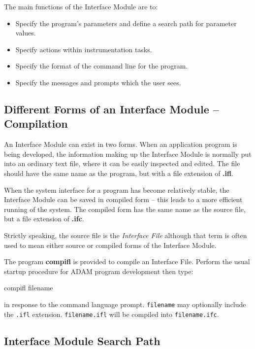 \documentclass[twoside,11pt,nolof]{starlink}
\begin{document}
The main functions of the Interface Module are to:
\begin{itemize}
\item Specify the program's parameters and define a search path for
parameter values.
\item Specify actions within instrumentation tasks.
\item Specify the format of the command line for the program.
\item Specify the messages and prompts which the user sees.
\end{itemize}

\subsection{Different Forms of an Interface Module -- Compilation
}

An Interface Module can exist in two forms. When an application
program is being developed, the information making up the Interface
Module is normally put into an ordinary text file, where it can be
easily inspected and edited.
The file should have the same name as the program, but with a file
extension of \textbf{.ifl}.

When the system interface for a program has become relatively stable, the
Interface Module can be saved in compiled form --
this leads to a more efficient running of the system.
The compiled form has the same name as the source file, but a file extension of
\textbf{.ifc}.

Strictly speaking, the source file is the \emph{Interface File} although that
term is often used to mean either source or compiled forms of the
Interface Module.

The program \textbf{compifl} is provided to compile an Interface File.
Perform the usual startup procedure for ADAM program development
then type:
\begin{terminalv}
compifl filename
\end{terminalv}
in response to the command language prompt.
\texttt{filename} may optionally include the \texttt{.ifl} extension.
\texttt{filename.ifl} will be compiled into \texttt{filename.ifc}.

\subsection{Interface Module Search Path
}
\end{document}
